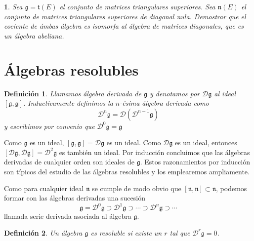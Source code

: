 \documentclass[a4paper,draft,12pt]{article}
\newtheorem{defi}{Definición}[section]%
\newtheorem{pro1}{}%
\newenvironment{pro}{\begin{pro1} \rm} {\end{pro1}}
\newcommand{\g}{\mathfrak{g}}%
\newcommand{\D}{\mathcal{D}}%
\newcommand{\df}[1]{\textsf{\color{blue}#1}}
\begin{document}
\begin{pro}

Sea $\g= \mathfrak{t}(E)$ el conjunto de matrices triangulares superiores.  Sea $\mathfrak{n}(E)$ el conjunto de matrices triangulares superiores de diagonal nula. Demostrar que el  cociente de ámbas álgebra es isomorfa al álgebra de matrices diagonales, que es un álgebra abeliana.

\end{pro}



\newpage
\section{Álgebras resolubles}

\begin{defi}

Llamamos  \df{álgebra derivada}  de $\g$ y denotamos por $\D \g$ al ideal $[\g,\g]$.  Inductivamente definimos la $n$-ésima álgebra derivada como 
$$
\D^n\g = \D(\D^{n-1}\g)
$$ 
y escribimos por convenio que $\D^0\g=\g$

\end{defi}

Como $\g$ es un ideal, $[\g,\g]= \D \g$ es un ideal.  Como $\D \g$ es un ideal, entonces $[\D\g,\D\g]= \D^2\g$ es también un ideal.  Por inducción concluimos que las álgebras derivadas de cualquier orden son ideales de $\g$.  Estos razonamientos por inducción son típicos del estudio de las álgebras resolubles y los emplearemos ampliamente.

Como para cualquier ideal $\mathfrak{n}$ se cumple de modo obvio que $[\mathfrak{n},\mathfrak{n}]\subset \mathfrak{n}$, podemos formar con las álgebras derivadas una sucesión
$$
\g = \D^0\g \supset \D^1 \g \supset \cdots \supset \D^n\g \supset \cdots
$$
llamada  \df{serie derivada}  asociada al álgebra $\g$.

\begin{defi}

Un álgebra $\g$ es  \df{resoluble}  si existe un $r$ tal que $\D^r \g=0$.

\end{defi}

\end{document}
